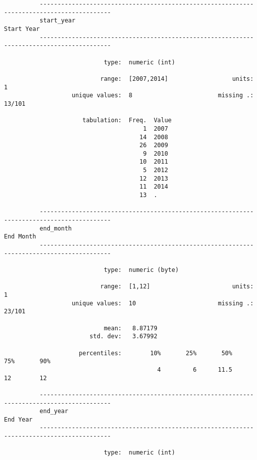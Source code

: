 \documentclass{article}
\begin{document}
\begin{verbatim}
          ------------------------------------------------------------------------------------------
          start_year                                                                      Start Year
          ------------------------------------------------------------------------------------------
          
                            type:  numeric (int)
          
                           range:  [2007,2014]                  units:  1
                   unique values:  8                        missing .:  13/101
          
                      tabulation:  Freq.  Value
                                       1  2007
                                      14  2008
                                      26  2009
                                       9  2010
                                      10  2011
                                       5  2012
                                      12  2013
                                      11  2014
                                      13  .
          
          ------------------------------------------------------------------------------------------
          end_month                                                                        End Month
          ------------------------------------------------------------------------------------------
          
                            type:  numeric (byte)
          
                           range:  [1,12]                       units:  1
                   unique values:  10                       missing .:  23/101
          
                            mean:   8.87179
                        std. dev:   3.67992
          
                     percentiles:        10%       25%       50%       75%       90%
                                           4         6      11.5        12        12
          
          ------------------------------------------------------------------------------------------
          end_year                                                                          End Year
          ------------------------------------------------------------------------------------------
          
                            type:  numeric (int)
          

\end{verbatim}
\end{document}
